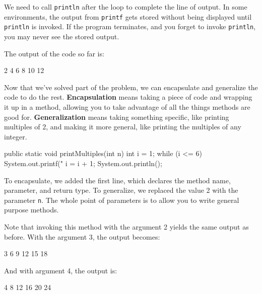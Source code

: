 \documentclass[12pt]{book}
\theoremstyle{exercise}
\newcommand{\java}[1]{\verb"#1"}
\newcommand{\java}[1]{\lstinline{#1}} %
\begin{document}
We need to call \java{println} after the loop to complete the line of output.
In some environments, the output from \java{printf} gets stored without being displayed until \java{println} is invoked.
If the program terminates, and you forget to invoke \java{println}, you may never see the stored output.

The output of the code so far is:

\begin{stdout}
    2    4    6    8   10   12
\end{stdout}


Now that we've solved part of the problem, we can encapsulate and generalize the code to do the rest.
{\bf Encapsulation} means taking a piece of code and wrapping it up in a method, allowing you to take advantage of all the things methods are good for.
{\bf Generalization} means taking something specific, like printing multiples of 2, and making it more general, like printing the multiples of any integer.

\begin{code}
    public static void printMultiples(int n) {
        int i = 1;
        while (i <= 6) {
            System.out.printf("%
            i = i + 1;
        }
        System.out.println();
    }
\end{code}

To encapsulate, we added the first line, which declares the method name, parameter, and return type.
To generalize, we replaced the value 2 with the parameter \java{n}.
The whole point of parameters is to allow you to write general purpose methods.

Note that invoking this method with the argument 2 yields the same output as before.
With the argument 3, the output becomes:

\begin{stdout}
    3    6    9   12   15   18
\end{stdout}

And with argument 4, the output is:

\begin{stdout}
    4    8   12   16   20   24
\end{stdout}
\end{document}
